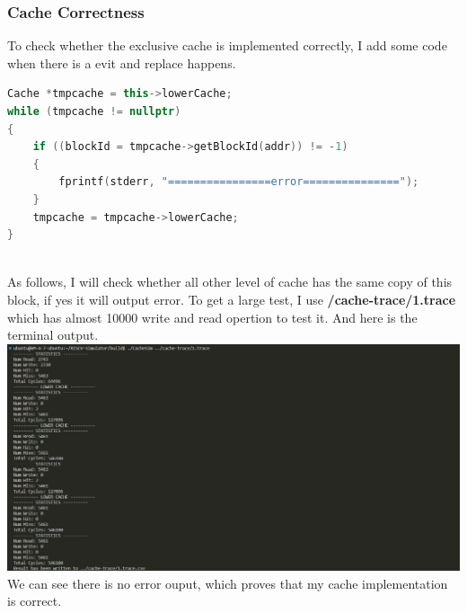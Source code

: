 \documentclass{article}
\begin{document}
\subsubsection{Cache Correctness}
To check whether the exclusive cache is implemented correctly, I add some code when there is a evit and replace happens.
\begin{lstlisting}[language=c++]
Cache *tmpcache = this->lowerCache;
while (tmpcache != nullptr)
{
    if ((blockId = tmpcache->getBlockId(addr)) != -1)
    {
        fprintf(stderr, "================error===============");
    }
    tmpcache = tmpcache->lowerCache;
}
    
\end{lstlisting}
As follows, I will check whether all other level of cache has the same copy of this block, if yes it will output error. To get a large test, I use \textbf{/cache-trace/1.trace} which has almost 10000 write and read opertion to test it. And here is the terminal output.\\
\includegraphics[scale = 0.3]{Cache correctness.png}\\
We can see there is no error ouput, which proves that my cache implementation is correct.
\end{document}
